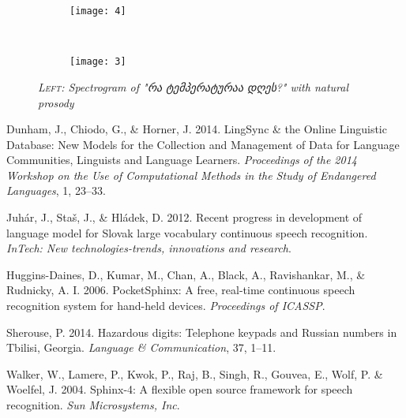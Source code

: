 \documentclass[12pt]{amsart}
\begin{document}
\newpage
\begin{figure}
    \centering
    \begin{subfigure}[b]{0.55\textwidth}
        \texttt{[image: 4]}
        \label{fig:mono}
    \end{subfigure}
    ~ %
    \begin{subfigure}[b]{0.45\textwidth}
        \texttt{[image: 3]}
        \label{fig:bil}
    \end{subfigure}
    \caption{\footnotesize{\textit{\textsc{Left:} Spectrogram of "რა ტემპერატურაა დღეს?" with natural prosody}}}\label{fig:prosody2}
\end{figure}





\begin{thebibliography}{17}

Dunham, J., Chiodo, G., \& Horner, J. 2014. LingSync \& the Online Linguistic Database: New Models for the Collection and Management of Data for Language Communities, Linguists and Language Learners. \emph{Proceedings of the 2014 Workshop on the Use of Computational Methods in the Study of Endangered Languages}, 1, 23--33.


Juh{\'a}r, J., Sta{\v{s}}, J., \& Hl{\'a}dek, D. 2012. Recent progress in development of language model for Slovak large vocabulary continuous speech recognition. \emph{InTech: New technologies-trends, innovations and research}.


Huggins-Daines, D., Kumar, M., Chan, A., Black, A.,  Ravishankar, M., \& Rudnicky,  A. I. 2006. PocketSphinx: A free, real-time continuous speech recognition system for hand-held devices. \emph{Proceedings of ICASSP}.


Sherouse, P. 2014. Hazardous digits: Telephone keypads and Russian numbers in Tbilisi, Georgia. \emph{Language \& Communication}, 37, 1--11.


Walker, W., Lamere, P., Kwok, P., Raj, B., Singh, R., Gouvea, E., Wolf, P. \& Woelfel, J. 2004. Sphinx-4: A flexible open source framework for speech recognition. \emph{Sun Microsystems, Inc}.


\end{thebibliography}
\end{document}
